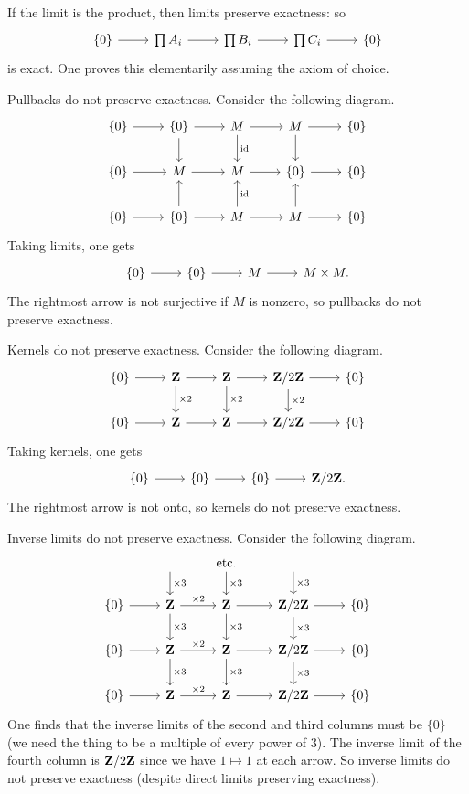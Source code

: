 \documentclass[11pt, oneside,margin=1in]{article}
\begin{document}
If the limit is the product, then limits preserve exactness: so
\[
\begin{tikzcd}
\{0\} \arrow[r] &\prod A_i \arrow[r] &\prod B_i \arrow[r] &\prod C_i \arrow[r] & \{0\}    	
\end{tikzcd}
\]
is exact. One proves this elementarily assuming the axiom of choice.

Pullbacks do not preserve exactness. Consider the following diagram.
\[
\begin{tikzcd}
	\{0\} \arrow[r] & \{0\} \arrow[r] \arrow[d] & M \arrow[r] \arrow[d, "\id"] & M \arrow[r] \arrow[d] & \{0\}\\
	\{0\} \arrow[r] & M \arrow[r] & M \arrow[r] & \{0\} \arrow[r] & \{0\}\\
	\{0\} \arrow[r] & \{0\} \arrow[r] \arrow[u] & M \arrow[u,swap, "\id"] \arrow[r] & M \arrow[r] \arrow[u] & \{0\}
\end{tikzcd}
\]
Taking limits, one gets
\[
\begin{tikzcd}
	\{0\} \arrow[r] & \{0\} \arrow[r] & M \arrow[r] & M\times M.
\end{tikzcd}
\]
The rightmost arrow is not surjective if $M$ is nonzero, so pullbacks do not preserve exactness.

Kernels do not preserve exactness. Consider the following diagram.
\[
\begin{tikzcd}
	\{0\} \arrow[r] & \Z \arrow[r] \arrow[d, "\times 2"] & \Z \arrow[r] \arrow[d, "\times 2"] & \Zmod 2 \arrow[r] \arrow[d, "\times 2"] & \{0\}\\
	\{0\} \arrow[r] & \Z \arrow[r] & \Z \arrow[r] & \Zmod 2 \arrow[r] & \{0\}
\end{tikzcd}
\]
Taking kernels, one gets
\[
\begin{tikzcd}
	\{0\} \arrow[r]&\{0\} \arrow[r]&\{0\} \arrow[r]&\Zmod 2.
\end{tikzcd}
\]
The rightmost arrow is not onto, so kernels do not preserve exactness.

Inverse limits do not preserve exactness. Consider the following diagram.
\[
\begin{tikzcd}
	& \text{ } \arrow[d, "\times 3"] & \textrm{etc.} \arrow[d, "\times 3"] & \text{ } \arrow[d, "\times 3"] &\\
	\{0\} \arrow[r] & \Z \arrow[r,"\times 2"] \arrow[d, "\times 3"] & \Z \arrow[r]\arrow[d, "\times 3"] & \Zmod 2 \arrow[r] \arrow[d, "\times 3"] & \{0\}\\
\{0\} \arrow[r] & \Z \arrow[r,"\times 2"] \arrow[d, "\times 3"] & \Z \arrow[r]\arrow[d, "\times 3"] & \Zmod 2 \arrow[r] \arrow[d, "\times 3"] & \{0\}\\
\{0\} \arrow[r] & \Z \arrow[r, "\times 2"] & \Z \arrow[r] & \Zmod 2 \arrow[r] & \{0\}
\end{tikzcd}
\]
One finds that the inverse limits of the second and third columns must be $\{0\}$ (we need the thing to be a multiple of every power of $3$). The inverse limit of the fourth column is $\mathbf Z / 2\mathbf Z$ since we have $1\longmapsto 1$ at each arrow. So inverse limits do not preserve exactness (despite direct limits preserving exactness). 
\end{document}
